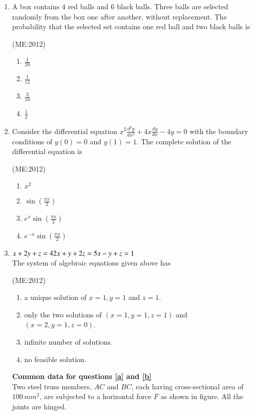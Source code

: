\documentclass[journal,12pt,onecolumn]{IEEEtran}
\theoremstyle{remark}
\begin{document}
\begin{enumerate}
    \item A box contains $4$ red balls and $6$ black balls. Three balls are selected randomly from the box one after another, without replacement. The probability that the selected set contains one red ball and two black balls is

	     \hfill{(ME:2012)}
\begin{multicols}{4}
    \begin{enumerate}
        \item $\frac{1}{20}$
        \item $\frac{1}{12}$
        \item $\frac{3}{10}$
        \item $\frac{1}{2}$
    \end{enumerate}
\end{multicols}

    \item 
	    Consider the differential equation
   $ x^2 \frac{d^2y}{dx^2} + 4x \frac{dy}{dx} - 4y = 0$
    with the boundary conditions of $y(0) = 0$ and $y(1) = 1$. The complete solution of the differential equation is

     \hfill{(ME:2012)}
\begin{multicols}{4}
    \begin{enumerate}
        \item $x^2$
	\item $\sin (\frac{\pi x}{2})$
	\item $e^x \sin (\frac{\pi x}{2})$
	\item $e^{-x} \sin (\frac{\pi x}{2})$
    \end{enumerate}
\end{multicols}

    \item
$x + 2y + z = 4 \\
2x + y + 2z = 5 \\
x - y + z = 1$\\
    The system of algebraic equations given above has

     \hfill{(ME:2012)}
    \begin{enumerate}
        \item a unique solution of $x = 1, y = 1$ and $z = 1$.
        \item only the two solutions of $(x = 1, y = 1, z = 1)$ and $(x = 2, y = 1, z = 0)$.
        \item infinite number of solutions.
        \item no feasible solution.
    \end{enumerate}
\vspace{0.5cm}
     \textbf{Common data for questions \ref{a} and \ref{b}} \\ 
    Two steel truss members, $AC$ and $BC$, each having cross-sectional area of $100 \, {mm}^2$, are subjected to a horizontal force $F$ as shown in figure. All the joints are hinged.
    \begin{center}
	    
    \end{center}


\end{enumerate}
\end{document}
